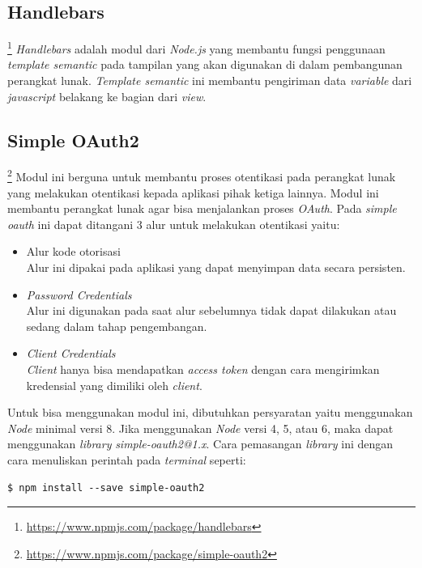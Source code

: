 \subsection{Handlebars}\footnote{\url{https://www.npmjs.com/package/handlebars}}
\textit{Handlebars} adalah modul dari \textit{Node.js} yang membantu fungsi penggunaan \textit{template semantic} pada tampilan yang akan digunakan di dalam pembangunan perangkat lunak. \textit{Template semantic} ini membantu pengiriman data \textit{variable} dari \textit{javascript} belakang ke bagian dari \textit{view}. 

\subsection{Simple OAuth2}\footnote{\url{https://www.npmjs.com/package/simple-oauth2}}
Modul ini berguna untuk membantu proses otentikasi pada perangkat lunak yang melakukan otentikasi kepada aplikasi pihak ketiga lainnya. Modul ini membantu perangkat lunak agar bisa menjalankan proses \textit{OAuth}. Pada \textit{simple oauth} ini dapat ditangani 3 alur untuk melakukan otentikasi yaitu:
\begin{itemize}
    \item Alur kode otorisasi\\
    Alur ini dipakai pada aplikasi yang dapat menyimpan data secara persisten. 
    \item \textit{Password Credentials}\\
    Alur ini digunakan pada saat alur sebelumnya tidak dapat dilakukan atau sedang dalam tahap pengembangan. 
    \item \textit{Client Credentials}\\
    \textit{Client} hanya bisa mendapatkan \textit{access token} dengan cara mengirimkan kredensial yang dimiliki oleh \textit{client}. 
\end{itemize}

Untuk bisa menggunakan modul ini, dibutuhkan persyaratan yaitu menggunakan \textit{Node} minimal versi 8. Jika menggunakan \textit{Node} versi 4, 5, atau 6, maka dapat menggunakan \textit{library} \textit{simple-oauth2@1.x}. Cara pemasangan \textit{library} ini dengan cara menuliskan perintah pada \textit{terminal} seperti: 

\begin{lstlisting}
$ npm install --save simple-oauth2
\end{lstlisting}

